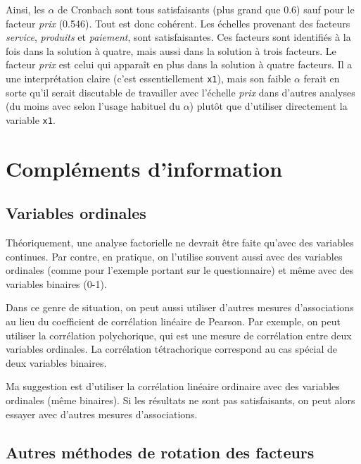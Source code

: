 \documentclass[
  11pt,
  letterpaper,
]{book}
\theoremstyle{definition}
\theoremstyle{remark}
\begin{document}
Ainsi, les \(\alpha\) de Cronbach sont tous satisfaisants (plus grand
que 0.6) sauf pour le facteur \emph{prix} (0.546). Tout est donc
cohérent. Les échelles provenant des facteurs \emph{service},
\emph{produits} et \emph{paiement}, sont satisfaisantes. Ces facteurs
sont identifiés à la fois dans la solution à quatre, mais aussi dans la
solution à trois facteurs. Le facteur \emph{prix} est celui qui apparaît
en plus dans la solution à quatre facteurs. Il a une interprétation
claire (c'est essentiellement \texttt{x1}), mais son faible \(\alpha\)
ferait en sorte qu'il serait discutable de travailler avec l'échelle
\emph{prix} dans d'autres analyses (du moins avec selon l'usage habituel
du \(\alpha\)) plutôt que d'utiliser directement la variable
\texttt{x1}.

\hypertarget{compluxe9ments-dinformation}{%
\section{Compléments d'information}\label{compluxe9ments-dinformation}}

\hypertarget{variables-ordinales}{%
\subsection{Variables ordinales}\label{variables-ordinales}}

Théoriquement, une analyse factorielle ne devrait être faite qu'avec des
variables continues. Par contre, en pratique, on l'utilise souvent aussi
avec des variables ordinales (comme pour l'exemple portant sur le
questionnaire) et même avec des variables binaires (0-1).

Dans ce genre de situation, on peut aussi utiliser d'autres mesures
d'associations au lieu du coefficient de corrélation linéaire de
Pearson. Par exemple, on peut utiliser la corrélation polychorique, qui
est une mesure de corrélation entre deux variables ordinales. La
corrélation tétrachorique correspond au cas spécial de deux variables
binaires.

Ma suggestion est d'utiliser la corrélation linéaire ordinaire avec des
variables ordinales (même binaires). Si les résultats ne sont pas
satisfaisants, on peut alors essayer avec d'autres mesures
d'associations.

\hypertarget{autres-muxe9thodes-de-rotation-des-facteurs}{%
\subsection{Autres méthodes de rotation des
facteurs}\label{autres-muxe9thodes-de-rotation-des-facteurs}}
\end{document}
